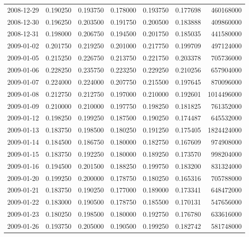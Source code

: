 \begin{tabular}{lrrrrrr}
2008-12-29 &    0.190250 &    0.193750 &    0.178000 &    0.193750 &    0.177698 &   460168000 \\
2008-12-30 &    0.196250 &    0.203500 &    0.191750 &    0.200500 &    0.183888 &   409860000 \\
2008-12-31 &    0.198000 &    0.206750 &    0.194500 &    0.201750 &    0.185035 &   441580000 \\
2009-01-02 &    0.201750 &    0.219250 &    0.201000 &    0.217750 &    0.199709 &   497124000 \\
2009-01-05 &    0.215250 &    0.226750 &    0.213750 &    0.221750 &    0.203378 &   705736000 \\
2009-01-06 &    0.228250 &    0.235750 &    0.223250 &    0.229250 &    0.210256 &   657904000 \\
2009-01-07 &    0.224000 &    0.224000 &    0.207750 &    0.215500 &    0.197645 &   870096000 \\
2009-01-08 &    0.212750 &    0.212750 &    0.197000 &    0.210000 &    0.192601 &  1014496000 \\
2009-01-09 &    0.210000 &    0.210000 &    0.197750 &    0.198250 &    0.181825 &   761352000 \\
2009-01-12 &    0.198250 &    0.199250 &    0.187500 &    0.190250 &    0.174487 &   645532000 \\
2009-01-13 &    0.183750 &    0.198500 &    0.180250 &    0.191250 &    0.175405 &  1824424000 \\
2009-01-14 &    0.184500 &    0.186750 &    0.180000 &    0.182750 &    0.167609 &   974908000 \\
2009-01-15 &    0.183750 &    0.192250 &    0.180000 &    0.189250 &    0.173570 &   998204000 \\
2009-01-16 &    0.194500 &    0.201500 &    0.188250 &    0.199750 &    0.183200 &   831324000 \\
2009-01-20 &    0.199250 &    0.200000 &    0.178750 &    0.180250 &    0.165316 &   705788000 \\
2009-01-21 &    0.183750 &    0.190250 &    0.177000 &    0.189000 &    0.173341 &   648472000 \\
2009-01-22 &    0.183000 &    0.190500 &    0.178750 &    0.185500 &    0.170131 &   547656000 \\
2009-01-23 &    0.180250 &    0.198500 &    0.180000 &    0.192750 &    0.176780 &   633616000 \\
2009-01-26 &    0.193750 &    0.205000 &    0.190500 &    0.199250 &    0.182742 &   581748000 \\

\end{tabular}
